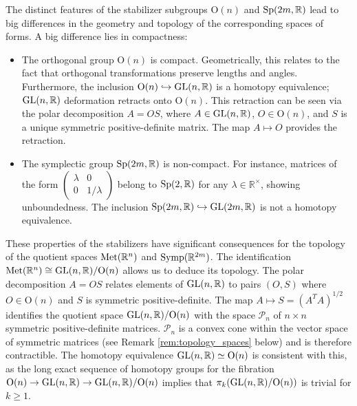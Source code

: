 The distinct features of the stabilizer subgroups $\text{O}(n)$ and $\mathrm{Sp}(2m, \mathbb{R})$ lead to big differences in the geometry and topology of the corresponding spaces of forms. A big difference lies in compactness:
\begin{itemize}
    \item The orthogonal group $\text{O}(n)$ is compact. Geometrically, this relates to the fact that orthogonal transformations preserve lengths and angles. Furthermore, the inclusion $\text{O}(n) \hookrightarrow \mathrm{GL}(n, \mathbb{R})$ is a homotopy equivalence; $\mathrm{GL}(n, \mathbb{R})$ deformation retracts onto $\text{O}(n)$. This retraction can be seen via the polar decomposition $A = OS$, where $A \in \mathrm{GL}(n, \mathbb{R})$, $O \in \text{O}(n)$, and $S$ is a unique symmetric positive-definite matrix. The map $A \mapsto O$ provides the retraction.
    \item The symplectic group $\mathrm{Sp}(2m, \mathbb{R})$ is non-compact. For instance, matrices of the form $\begin{pmatrix} \lambda & 0 \\ 0 & 1/\lambda \end{pmatrix}$ belong to $\mathrm{Sp}(2, \mathbb{R})$ for any $\lambda \in \mathbb{R}^\times$, showing unboundedness. The inclusion $\mathrm{Sp}(2m, \mathbb{R}) \hookrightarrow \mathrm{GL}(2m, \mathbb{R})$ is not a homotopy equivalence.
\end{itemize}
These properties of the stabilizers have significant consequences for the topology of the quotient spaces $\operatorname{Met}(\mathbb{R}^n)$ and $\operatorname{Symp}(\mathbb{R}^{2m})$.
The identification $\operatorname{Met}(\mathbb{R}^n) \cong \mathrm{GL}(n, \mathbb{R}) / \text{O}(n)$ allows us to deduce its topology. The polar decomposition $A=OS$ relates elements of $\mathrm{GL}(n, \mathbb{R})$ to pairs $(O, S)$ where $O \in \text{O}(n)$ and $S$ is symmetric positive-definite. The map $A \mapsto S = (A^T A)^{1/2}$ identifies the quotient space $\mathrm{GL}(n, \mathbb{R}) / \text{O}(n)$ with the space $\mathcal{P}_n$ of $n \times n$ symmetric positive-definite matrices. $\mathcal{P}_n$ is a convex cone within the vector space of symmetric matrices (see Remark \ref{rem:topology_spaces} below) and is therefore contractible. The homotopy equivalence $\mathrm{GL}(n, \mathbb{R}) \simeq \text{O}(n)$ is consistent with this, as the long exact sequence of homotopy groups for the fibration $\text{O}(n) \to \mathrm{GL}(n, \mathbb{R}) \to \mathrm{GL}(n, \mathbb{R})/\text{O}(n)$ implies that $\pi_k(\mathrm{GL}(n, \mathbb{R})/\text{O}(n))$ is trivial for $k \ge 1$.

